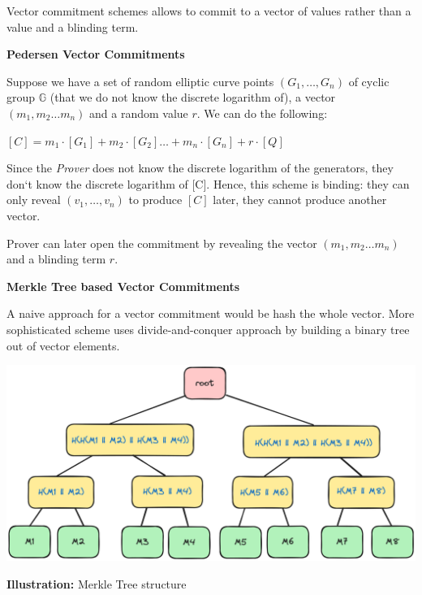 \documentclass[../lecture-notes.tex]{subfiles}
\begin{document}
Vector commitment schemes allows to commit to a vector of values rather than a value and a blinding term.

\vspace{0.5 cm}

\textbf{Pedersen Vector Commitments}

Suppose we have a set of random elliptic curve points $(G_1, \ldots ,G_n)$ of cyclic group $\mathbb{G}$ 
(that we do not know the discrete logarithm of), a vector $(m_1, m_2 \ldots m_n)$ and a random value $r$. We can do the following:

\begin{center}
    $ [C] = m_1\cdot[G_1] + m_2 \cdot [G_2] \ldots + m_n \cdot [G_n] + r \cdot [Q]$ 
\end{center}

Since the \textit{Prover} does not know the discrete logarithm of the generators, they don`t know the discrete logarithm of [C]. 
Hence, this scheme is binding: they can only reveal $(v_1, \ldots ,v_n)$ to produce $[C]$ later, they cannot produce another vector.

Prover can later open the commitment by revealing the vector $(m_1, m_2 \ldots m_n)$ and a blinding term $r$.

\vspace{0.5 cm}

\textbf{Merkle Tree based Vector Commitments}

A naive approach for a vector commitment would be hash the whole vector. More sophisticated scheme uses divide-and-conquer approach by building a binary tree out of vector elements.

\begin{center}
    \centering\includegraphics[width=0.9\linewidth, clip]{images/lecture_5/MerkleTree.png}

    \scriptsize{\textbf{Illustration:} Merkle Tree structure}
\end{center}
\end{document}
